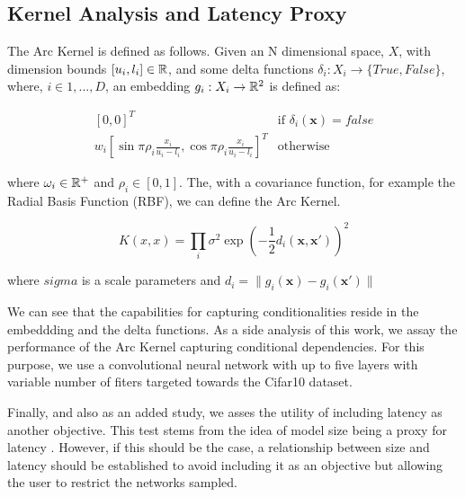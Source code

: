 \documentclass[10pt, a4paper, twocolumn]{article}
\begin{document}
\subsection{Kernel Analysis and Latency Proxy}\label{analysis}

The Arc Kernel \cite{Swersky2014} is defined as follows. Given an N dimensional space, $X$, with dimension bounds $[u_{i}, l_{i}] \in \Bbb{R}$, and some delta functions $ \delta_{i}: X_{i} \rightarrow \{True, False\}$, where, $i \in {1,...,D}$, an embedding $g_{i}: X_{i}\rightarrow \Bbb{R}^{2}$ is defined as:

\[
\begin{array}{ll}
[0, 0]^{T}& \mbox{if $\delta_{i}(\mathbf{x}) = false$} \\
 w_{i}[\sin{\pi\rho_{i}\frac{x_{i}}{u_{i}-l_{i}}},\cos{\pi\rho_{i}\frac{x_{i}}{u_{i}-l_{i}}}]^{T} & \mbox{otherwise}
 \end{array} 
\]

where $\omega_{i}\in\Bbb{R}^{+}$ and $\rho_{i}\in[0, 1]$. The, with a covariance function, for example the Radial Basis Function (RBF), we can define the Arc Kernel.


\begin{equation}
K(x, x) =  \prod_{i}\sigma^{2}\exp(-\frac{1}{2}d_{i}(\mathbf{x}, \mathbf{x'}))^{2}
\end{equation}

where $sigma$ is a scale parameters and $d_{i}=\|g_{i}(\mathbf{x})-g_{i}(\mathbf{x'})\|$

We can see that the capabilities for capturing conditionalities reside in the embeddding and the delta functions. As a side analysis of this work, we assay the performance of the Arc Kernel capturing conditional dependencies. For this purpose, we use a convolutional neural network with up to five layers with variable number of fiters targeted towards the Cifar10 dataset.

Finally, and also as an added study, we asses the utility of including latency as another objective. This test stems from the idea of model size being a proxy for latency \cite{Loni2020}. However, if this should be the case, a relationship between size and latency should be established to avoid including it as an objective but allowing the user to restrict the networks sampled.
\end{document}
